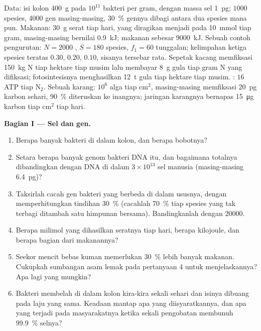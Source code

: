 \begin{problem}
\label{pb:b3:microbiomes:1}
Data: isi kolon \qty{400}{g} pada $10^{11}$ bakteri per gram, dengan massa
sel \qty{1}{pg}; $1000$ spesies, \num{4000} gen masing-masing, \qty{30}{\%}
gennya dibagi antara dua spesies mana pun. Makanan: \qty{30}{g} serat tiap
hari, yang diragikan menjadi  pada \qty{10}{mmol} tiap gram,
masing-masing bernilai \qty{0.9}{kJ}; makanan sebesar \qty{9000}{kJ}. Sebuah contoh pengurutan:
$N = 2000$ , $S = 180$ spesies, $f_{1} = 60$ tunggalan; kelimpahan
ketiga spesies teratas $0.30$, $0.20$, $0.10$, sisanya tersebar rata.
Sepetak kacang memfiksasi \qty{150}{kg} N tiap hektare tiap musim lalu membayar
\qty{8}{g} gula tiap gram N yang difiksasi; fotosintesisnya menghasilkan
\qty{12}{t} gula tiap hektare tiap musim. : $16$ ATP tiap
N$_{2}$. Sebuah karang: $10^{6}$ alga tiap cm$^{2}$, masing-masing memfiksasi \qty{20}{pg}
karbon sehari, \qty{90}{\%} diteruskan ke inangnya; jaringan karangnya
bernapas \qty{15}{\micro g} karbon tiap cm$^{2}$ tiap hari.

\medskip
\noindent\textbf{Bagian I --- Sel dan gen.}
\begin{enumerate}
  \item Berapa banyak bakteri di dalam kolon, dan berapa bobotnya?
  \item Setara berapa banyak genom bakteri DNA itu, dan bagaimana
        totalnya dibandingkan dengan DNA di dalam $3\times 10^{13}$ sel
        manusia (masing-masing \qty{6.4}{pg})?
  \item Taksirlah cacah gen bakteri yang berbeda di dalam ususnya,
        dengan memperhitungkan tindihan \qty{30}{\%} (cacahlah \qty{70}{\%}
        tiap spesies yang tak terbagi ditambah satu himpunan bersama).
        Bandingkanlah dengan \num{20000}.
  \item Berapa milimol  yang dihasilkan seratnya
        tiap hari, berapa kilojoule, dan berapa bagian dari
        makanannya?
  \item Seekor mencit bebas kuman memerlukan \qty{30}{\%} lebih banyak makanan.
        Cukupkah sumbangan asam lemak pada pertanyaan 4 untuk menjelaskannya?
        Apa lagi yang mungkin?
  \item Bakteri membelah di dalam kolon kira-kira sekali sehari dan isinya
        dibuang pada laju yang sama. Keadaan mantap apa yang diisyaratkannya,
        dan apa yang terjadi pada masyarakatnya ketika sekali pengobatan
         membunuh \qty{99.9}{\%} selnya?
\end{enumerate}


\end{problem}
